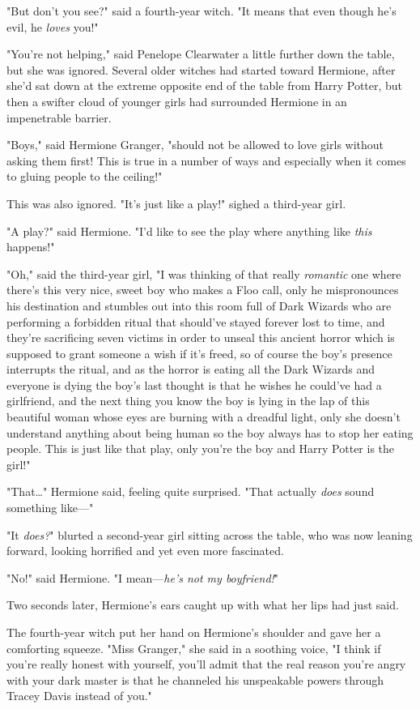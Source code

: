 "But don't you see?" said a fourth-year witch. "It means that even though he's 
evil, he \emph{loves} you!"

"You're not helping," said Penelope Clearwater a little further down the table, 
but she was ignored. Several older witches had started toward Hermione, after 
she'd sat down at the extreme opposite end of the table from Harry Potter, but 
then a swifter cloud of younger girls had surrounded Hermione in an 
impenetrable barrier.

"Boys," said Hermione Granger, "should not be allowed to love girls without 
asking them first! This is true in a number of ways and especially when it 
comes to gluing people to the ceiling!"

This was also ignored. "It's just like a play!" sighed a third-year girl.

"A play?" said Hermione. "I'd like to see the play where anything like 
\emph{this} happens!"

"Oh," said the third-year girl, "I was thinking of that really \emph{romantic} 
one where there's this very nice, sweet boy who makes a Floo call, only he 
mispronounces his destination and stumbles out into this room full of Dark 
Wizards who are performing a forbidden ritual that should've stayed forever 
lost to time, and they're sacrificing seven victims in order to unseal this 
ancient horror which is supposed to grant someone a wish if it's freed, so of 
course the boy's presence interrupts the ritual, and as the horror is eating 
all the Dark Wizards and everyone is dying the boy's last thought is that he 
wishes he could've had a girlfriend, and the next thing you know the boy is 
lying in the lap of this beautiful woman whose eyes are burning with a dreadful 
light, only she doesn't understand anything about being human so the boy always 
has to stop her eating people. This is just like that play, only you're the boy 
and Harry Potter is the girl!"

"That{\ldots}" Hermione said, feeling quite surprised. "That actually 
\emph{does} sound something like---"

"It \emph{does?}" blurted a second-year girl sitting across the table, who was 
now leaning forward, looking horrified and yet even more fascinated.

"No!" said Hermione. "I mean---\emph{he's not my boyfriend!}"

Two seconds later, Hermione's ears caught up with what her lips had just said.

The fourth-year witch put her hand on Hermione's shoulder and gave her a 
comforting squeeze. "Miss Granger," she said in a soothing voice, "I think if 
you're really honest with yourself, you'll admit that the real reason you're 
angry with your dark master is that he channeled his unspeakable powers through 
Tracey Davis instead of you."

